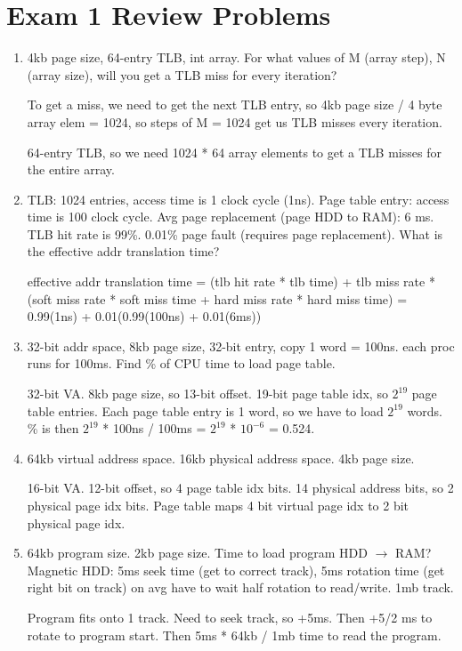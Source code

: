 \documentclass[10pt]{article}
\begin{document}
\section{Exam 1 Review Problems}
\begin{enumerate}
    \item 4kb page size, 64-entry TLB, int array.
        For what values of M (array step), N (array size), will you get a TLB miss for every iteration?

        To get a miss, we need to get the next TLB entry, so 4kb page size / 4 byte array elem = 1024,
        so steps of M = 1024 get us TLB misses every iteration.

        64-entry TLB, so we need 1024 * 64 array elements to get a TLB misses for the entire array.

    \item TLB: 1024 entries, access time is 1 clock cycle (1ns).
        Page table entry: access time is 100 clock cycle.
        Avg page replacement (page HDD to RAM): 6 ms.
        TLB hit rate is 99\%.
        0.01\% page fault (requires page replacement).
        What is the effective addr translation time?

        effective addr translation time = (tlb hit rate * tlb time) + tlb miss rate *
        (soft miss rate * soft miss time + hard miss rate * hard miss time) =
        0.99(1ns) + 0.01(0.99(100ns) + 0.01(6ms))

    \item 32-bit addr space, 8kb page size, 32-bit entry, copy 1 word = 100ns. each proc runs for 100ms.
        Find \% of CPU time to load page table.

        32-bit VA. 8kb page size, so 13-bit offset. 19-bit page table idx, so $2^{19}$ page table entries.
        Each page table entry is 1 word, so we have to load $2^{19}$ words. \% is then $2^{19}$ * 100ns
        / 100ms = $2^{19}$ * $10^{-6}$ = 0.524.

    \item 64kb virtual address space. 16kb physical address space. 4kb page size.

        16-bit VA. 12-bit offset, so 4 page table idx bits. 14 physical address bits, so 2 physical page idx
        bits. Page table maps 4 bit virtual page idx to 2 bit physical page idx.

    \item 64kb program size. 2kb page size. Time to load program HDD $\to$ RAM?
        Magnetic HDD: 5ms seek time (get to correct track), 5ms rotation time (get right bit on track)
        on avg have to wait half rotation to read/write.
        1mb track.

        Program fits onto 1 track. Need to seek track, so +5ms.
        Then +5/2 ms to rotate to program start.
        Then 5ms * 64kb / 1mb time to read the program.

\end{enumerate}
\end{document}
